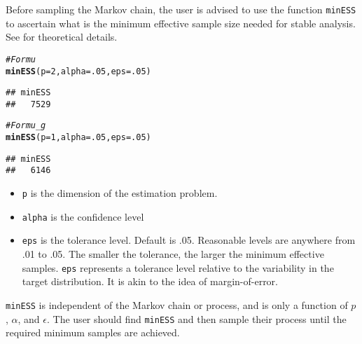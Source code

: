 \documentclass[11pt]{article}\usepackage[]{graphicx}\usepackage[]{color}
\makeatletter
\newcommand{\hlnum}[1]{\textcolor[rgb]{0.686,0.059,0.569}{#1}}%
\newcommand{\hlcom}[1]{\textcolor[rgb]{0.678,0.584,0.686}{\textit{#1}}}%
\newcommand{\hlstd}[1]{\textcolor[rgb]{0.345,0.345,0.345}{#1}}%
\newcommand{\hlkwc}[1]{\textcolor[rgb]{0.333,0.667,0.333}{#1}}%
\newcommand{\hlkwd}[1]{\textcolor[rgb]{0.737,0.353,0.396}{\textbf{#1}}}%
\newenvironment{kframe}{%
 \def\at@end@of@kframe{}%
 \ifinner\ifhmode%
  \def\at@end@of@kframe{\end{minipage}}%
  \begin{minipage}{\columnwidth}%
 \fi\fi%
 \def\FrameCommand##1{\hskip\@totalleftmargin \hskip-\fboxsep
 \colorbox{shadecolor}{##1}\hskip-\fboxsep
     \hskip-\linewidth \hskip-\@totalleftmargin \hskip\columnwidth}%
 \MakeFramed {\advance\hsize-\width
   \@totalleftmargin\z@ \linewidth\hsize
   \@setminipage}}%
 {\par\unskip\endMakeFramed%
 \at@end@of@kframe}
\newenvironment{knitrout}{}{} %
\makeatother
\begin{document}
Before sampling the Markov chain, the user is advised to use the function \texttt{minESS} to ascertain what is the minimum effective sample size needed for stable analysis. See \cite{vats:fleg:jones:2017b} for theoretical details.

\begin{knitrout}
\color{fgcolor}\begin{kframe}
\begin{alltt}
\hlcom{# For mu}
\hlkwd{minESS}\hlstd{(}\hlkwc{p} \hlstd{=} \hlnum{2}\hlstd{,} \hlkwc{alpha} \hlstd{=} \hlnum{.05}\hlstd{,} \hlkwc{eps} \hlstd{=} \hlnum{.05}\hlstd{)}
\end{alltt}
\begin{verbatim}
## minESS 
##   7529
\end{verbatim}
\begin{alltt}
\hlcom{#For mu_g}
\hlkwd{minESS}\hlstd{(}\hlkwc{p} \hlstd{=} \hlnum{1}\hlstd{,} \hlkwc{alpha} \hlstd{=} \hlnum{.05}\hlstd{,} \hlkwc{eps} \hlstd{=} \hlnum{.05}\hlstd{)}
\end{alltt}
\begin{verbatim}
## minESS 
##   6146
\end{verbatim}
\end{kframe}
\end{knitrout}

\begin{itemize}
\item \texttt{p} is the dimension of the estimation problem.
\item \texttt{alpha} is the confidence level
\item \texttt{eps} is the tolerance level. Default is .05. Reasonable levels are anywhere from .01 to .05. The smaller the tolerance, the larger the minimum effective samples. \texttt{eps} represents a tolerance level relative to the variability in the target distribution. It is akin to the idea of margin-of-error.
\end{itemize}

\texttt{minESS} is independent of the Markov chain or process, and is only a function of $p$, $\alpha$, and $\epsilon$. The user should find \texttt{minESS} and then sample their process until the required minimum samples are achieved. 
\end{document}
